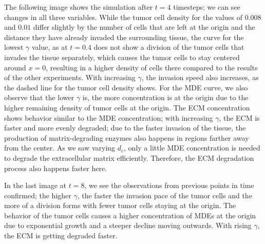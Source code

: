 The following image shows the simulation after $t=4$ timesteps; we can see changes in all three variables. 
While the tumor cell density for the values of $0.008$ and $0.01$ differ slightly by the number of cells that are left at the origin and the distance they have already invaded the surrounding tissue, the curve for the lowest $\gamma$ value, as at $t=0.4$ does not show a division of the tumor cells that invades the tissue separately, which causes the tumor cells to stay centered around $x=0$, resulting in a higher density of cells there compared to the results of the other experiments. With increasing $\gamma$, the invasion speed also increases, as the dashed line for the tumor cell density shows. For the MDE curve, we also observe that the lower $\gamma$ is, the more concentration is at the origin due to the higher remaining density of tumor cells at the origin. The ECM concentration shows behavior similar to the MDE concentration; with increasing $\gamma$, the ECM is faster and more evenly degraded; due to the faster invasion of the tissue, the production of matrix-degrading enzymes also happens in regions farther away from the center. As we saw varying $d_c$, only a little MDE concentration is needed to degrade the extracellular matrix efficiently. Therefore, the ECM degradation process also happens faster here.

In the last image at $t=8$, we see the observations from previous points in time confirmed; the higher $\gamma$, the faster the invasion pace of the tumor cells and the more of a division forms with fewer tumor cells staying at the origin. The behavior of the tumor cells causes a higher concentration of MDEs at the origin due to exponential growth and a steeper decline moving outwards. With rising $\gamma$, the ECM is getting degraded faster.

